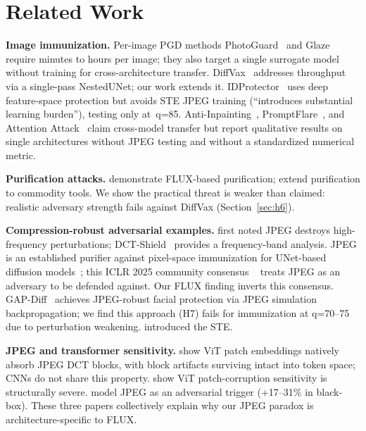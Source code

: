 \documentclass{article}
\begin{document}
\section{Related Work}

\textbf{Image immunization.}
Per-image PGD methods PhotoGuard~\citep{salman2023photoguard} and
Glaze~\citep{shan2023glaze} require minutes to hours per image; they also target a
single surrogate model without training for cross-architecture transfer.
DiffVax~\citep{ozdentarikcan2025diffvax} addresses throughput via a single-pass
NestedUNet; our work extends it.
IDProtector~\citep{chen2024idprotector} uses deep feature-space protection but
avoids STE JPEG training (``introduces substantial learning burden''), testing only
at~q=85.
Anti-Inpainting~\citep{guo2025antiinpaint}, PromptFlare~\citep{na2025promptflare},
and Attention Attack~\citep{trippodo2025attn} claim cross-model transfer but
report qualitative results on single architectures without JPEG testing and without a
standardized numerical metric.

\textbf{Purification attacks.}
\citet{zhao2026purify} demonstrate FLUX-based purification; \citet{pleimling2026commodity}
extend purification to commodity tools. We show the practical threat is weaker than
claimed: realistic adversary strength fails against DiffVax (Section~\ref{sec:h6}).

\textbf{Compression-robust adversarial examples.}
\citet{goodfellow2014fgsm} first noted JPEG destroys high-frequency perturbations;
DCT-Shield~\citep{dctshield2025} provides a frequency-band analysis.
JPEG is an established purifier against pixel-space immunization for UNet-based
diffusion models~\citep{zhao2023jpegbypass}; this ICLR 2025 community consensus
~\citep{vanle2025cannot} treats JPEG as an adversary to be defended against.
Our FLUX finding inverts this consensus.
GAP-Diff~\citep{gapdiff2025} achieves JPEG-robust facial protection via JPEG
simulation backpropagation; we find this approach (H7) fails for immunization
at q=70--75 due to perturbation weakening. \citet{bengio2013ste} introduced the STE.

\textbf{JPEG and transformer sensitivity.}
\citet{li2022jpegvit} show ViT patch embeddings natively absorb JPEG DCT blocks,
with block artifacts surviving intact into token space; CNNs do not share this property.
\citet{guo2023rspc} show ViT patch-corruption sensitivity is structurally severe.
\citet{chen2024transformadv} model JPEG as an adversarial trigger (+17--31\% in black-box).
These three papers collectively explain why our JPEG paradox is architecture-specific to FLUX.
\end{document}
